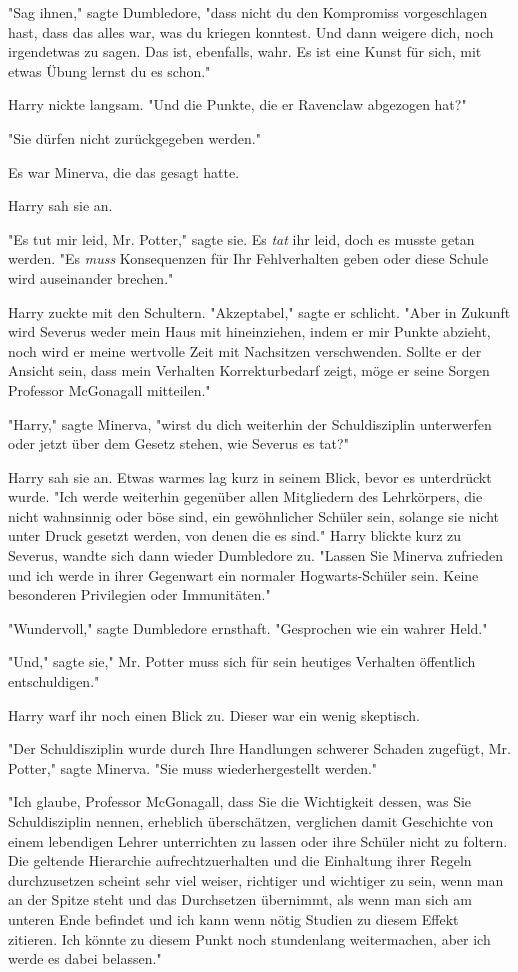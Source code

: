 {"Sag ihnen," sagte Dumbledore, "dass nicht du den Kompromiss vorgeschlagen hast, dass das alles war, was du kriegen konntest. Und dann weigere dich, noch irgendetwas zu sagen. Das ist, ebenfalls, wahr. Es ist eine Kunst für sich, mit etwas Übung lernst du es schon."

Harry nickte langsam. "Und die Punkte, die er Ravenclaw abgezogen hat?"

"Sie dürfen nicht zurückgegeben werden."

Es war Minerva, die das gesagt hatte.

Harry sah sie an.

"Es tut mir leid, Mr. Potter," sagte sie. Es \emph{tat} ihr leid, doch es musste getan werden. "Es \emph{muss} Konsequenzen für Ihr Fehlverhalten geben oder diese Schule wird auseinander brechen."

Harry zuckte mit den Schultern. "Akzeptabel," sagte er schlicht. "Aber in Zukunft wird Severus weder mein Haus mit hineinziehen, indem er mir Punkte abzieht, noch wird er meine wertvolle Zeit mit Nachsitzen verschwenden. Sollte er der Ansicht sein, dass mein Verhalten Korrekturbedarf zeigt, möge er seine Sorgen Professor McGonagall mitteilen."

"Harry," sagte Minerva, "wirst du dich weiterhin der Schuldisziplin unterwerfen oder jetzt über dem Gesetz stehen, wie Severus es tat?"

Harry sah sie an. Etwas warmes lag kurz in seinem Blick, bevor es unterdrückt wurde. "Ich werde weiterhin gegenüber allen Mitgliedern des Lehrkörpers, die nicht wahnsinnig oder böse sind, ein gewöhnlicher Schüler sein, solange sie nicht unter Druck gesetzt werden, von denen die es sind." Harry blickte kurz zu Severus, wandte sich dann wieder Dumbledore zu. "Lassen Sie Minerva zufrieden und ich werde in ihrer Gegenwart ein normaler Hogwarts-Schüler sein. Keine besonderen Privilegien oder Immunitäten."

"Wundervoll," sagte Dumbledore ernsthaft. "Gesprochen wie ein wahrer Held."

"Und," sagte sie," Mr. Potter muss sich für sein heutiges Verhalten öffentlich entschuldigen."

Harry warf ihr noch einen Blick zu. Dieser war ein wenig skeptisch.

"Der Schuldisziplin wurde durch Ihre Handlungen schwerer Schaden zugefügt, Mr. Potter," sagte Minerva. "Sie muss wiederhergestellt werden."

"Ich glaube, Professor McGonagall, dass Sie die Wichtigkeit dessen, was Sie Schuldisziplin nennen, erheblich überschätzen, verglichen damit Geschichte von einem lebendigen Lehrer unterrichten zu lassen oder ihre Schüler nicht zu foltern. Die geltende Hierarchie aufrechtzuerhalten und die Einhaltung ihrer Regeln durchzusetzen scheint sehr viel weiser, richtiger und wichtiger zu sein, wenn man an der Spitze steht und das Durchsetzen übernimmt, als wenn man sich am unteren Ende befindet und ich kann wenn nötig Studien zu diesem Effekt zitieren. Ich könnte zu diesem Punkt noch stundenlang weitermachen, aber ich werde es dabei belassen."

}
